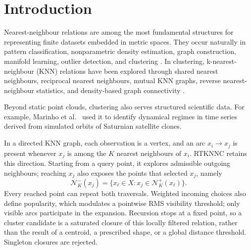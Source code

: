 \documentclass[pdflatex,sn-mathphys-num]{sn-jnl}
\newcommand{\calN}{\mathcal{N}}
\begin{document}

\maketitle


\section{Introduction}\label{sec:introduction}

Nearest-neighbour relations are among the most fundamental structures for representing finite datasets embedded in metric spaces. They occur naturally in pattern classification, nonparametric density estimation, graph construction, manifold learning, outlier detection, and clustering \citep{CoverHart1967,LoftsgaardenQuesenberry1965,Bentley1975,FriedmanBentleyFinkel1977,VonLuxburg2007}. In clustering, k-nearest-neighbour (KNN) relations have been explored through shared nearest neighbours, reciprocal nearest neighbours, mutual KNN graphs, reverse nearest-neighbour statistics, and density-based graph connectivity \citep{JarvisPatrick1973,Ertoz2003SNN,BritoChavezQuirozYukich1997,GowdaKrishna1978,ChowdhuryAmorim2018,XieLeeWangChenZhou2019}.

Beyond static point clouds, clustering also serves structured scientific data.
For example, Marinho et al.~\citep{PereiraMarinho2026ClusteringAO} used it to
identify dynamical regimes in time series derived from simulated orbits of
Saturnian satellite clones.

In a directed KNN graph, each observation is a vertex, and an arc
$x_i\to x_j$ is present whenever $x_j$ is among the $K$ nearest neighbours of
$x_i$. RTKNNC retains this direction. Starting from a query point, it explores
admissible outgoing neighbours; reaching $x_j$ also exposes the points that
selected $x_j$, namely
\begin{equation}
\calN_K^-(x_j)=\{x_\ell\in X: x_j\in\calN_K^+(x_\ell)\}.
\end{equation}
Every reached point can repeat both traversals. Weighted incoming choices also
define popularity, which modulates a pointwise RMS visibility threshold; only
visible arcs participate in the expansion. Recursion stops at a fixed point,
so a cluster candidate is a saturated closure of this locally filtered
relation, rather than the result of a centroid, a prescribed shape, or a global
distance threshold. Singleton closures are rejected.
\end{document}
